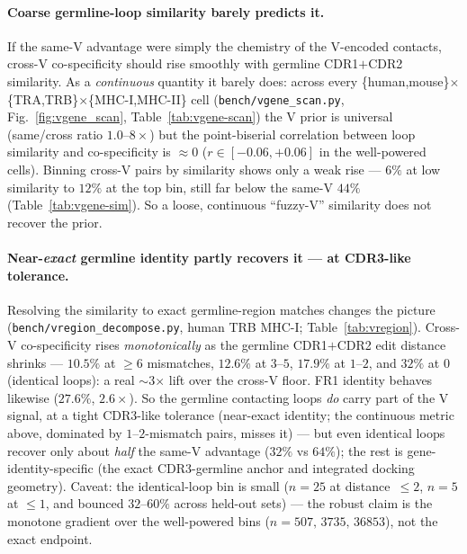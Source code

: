 \documentclass[11pt]{article}
\theoremstyle{oldplain}
\theoremstyle{oldrem}
\begin{document}
\paragraph{Coarse germline-loop similarity barely predicts it.} If the same-V advantage were simply the
chemistry of the V-encoded contacts, cross-V co-specificity should rise smoothly with germline
CDR1$+$CDR2 similarity. As a \emph{continuous} quantity it barely does: across every
\{human,mouse\}$\times$\{TRA,TRB\}$\times$\{MHC-I,MHC-II\} cell (\texttt{bench/vgene\_scan.py},
Fig.~\ref{fig:vgene_scan}, Table~\ref{tab:vgene-scan}) the V prior is universal (same/cross ratio
$1.0$--$8\times$) but the point-biserial correlation between loop similarity and co-specificity is
$\approx0$ ($r\in[-0.06,+0.06]$ in the well-powered cells). Binning cross-V pairs by similarity shows
only a weak rise --- $6\%$ at low similarity to $12\%$ at the top bin, still far below the same-V $44\%$
(Table~\ref{tab:vgene-sim}). So a loose, continuous ``fuzzy-V'' similarity does not recover the prior.

\paragraph{Near-\emph{exact} germline identity partly recovers it --- at CDR3-like tolerance.} Resolving
the similarity to exact germline-region matches changes the picture (\texttt{bench/vregion\_decompose.py},
human TRB MHC-I; Table~\ref{tab:vregion}). Cross-V co-specificity rises \emph{monotonically} as the
germline CDR1$+$CDR2 edit distance shrinks --- $10.5\%$ at $\ge6$ mismatches, $12.6\%$ at $3$--$5$,
$17.9\%$ at $1$--$2$, and $32\%$ at $0$ (identical loops): a real $\sim$3$\times$ lift over the cross-V
floor. FR1 identity behaves likewise ($27.6\%$, $2.6\times$). So the germline contacting loops \emph{do}
carry part of the V signal, at a tight CDR3-like tolerance (near-exact identity; the continuous metric
above, dominated by $1$--$2$-mismatch pairs, misses it) --- but even identical loops recover only about
\emph{half} the same-V advantage ($32\%$ vs $64\%$); the rest is gene-identity-specific (the exact
CDR3-germline anchor and integrated docking geometry). Caveat: the identical-loop bin is small ($n=25$
at distance~$\le2$, $n=5$ at $\le1$, and bounced $32$--$60\%$ across held-out sets) --- the robust claim
is the monotone gradient over the well-powered bins ($n=507,\,3735,\,36853$), not the exact endpoint.
\end{document}
